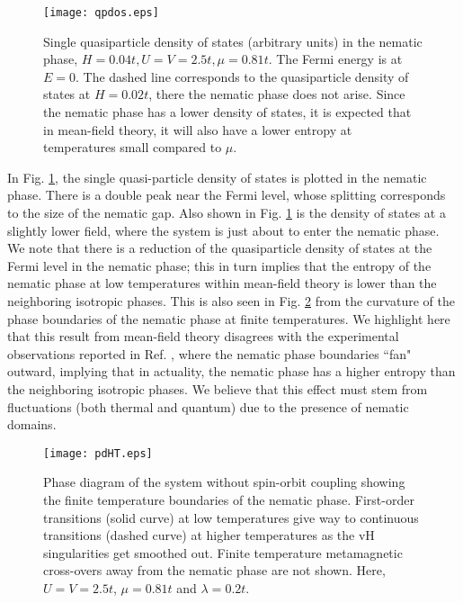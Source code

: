 \documentclass[prb,aps,amssymb,showpacs,twocolumn,amsmath,floatfix]{revtex4}
\begin{document}
\begin{figure}
\texttt{[image: qpdos.eps]}
\caption{ Single quasiparticle density of states (arbitrary units) in the nematic phase, $ H =0.04t, U=V=2.5t, \mu = 0.81t$.  
The Fermi energy is at $E=0$.  The dashed line corresponds to the quasiparticle density of states at 
  $H=0.02t$, there the nematic phase does not arise.  Since the nematic phase has a lower density 
  of states, it is expected that in mean-field theory, it will also have a lower entropy at temperatures small compared to $\mu$.   }
   \label{fig3}
\end{figure} 

In Fig. \ref{fig3}, the single quasi-particle density of states is plotted in the nematic phase.  There is a 
double peak near the Fermi level, whose splitting corresponds to the size of the nematic gap.  
Also shown in Fig. \ref{fig3} is the density of states at a slightly lower field, where the system is just 
about to enter the nematic phase.  We note that there is a reduction of the quasiparticle density 
of states at the Fermi level in the nematic phase; this in turn implies that the entropy of the nematic phase at low temperatures 
within mean-field theory is lower than the neighboring isotropic phases.  This is also seen 
in Fig. \ref{pdHT} from the curvature of the phase boundaries of the nematic phase at finite temperatures.  
We highlight here that this result from mean-field theory disagrees with the experimental observations 
reported  in Ref.  \cite{Borzi2007}, where the nematic phase boundaries ``fan" outward, implying  that in actuality, 
the nematic phase has a higher entropy than the neighboring isotropic phases.  We believe 
that this effect must stem from fluctuations (both thermal and quantum) due to the presence of 
nematic domains.  


\begin{figure}
\texttt{[image: pdHT.eps]}
\caption{Phase diagram of the system  without spin-orbit coupling showing the finite temperature 
boundaries of the nematic phase.  First-order transitions (solid curve) at low temperatures give way 
to continuous transitions (dashed curve) at higher temperatures as the vH singularities get smoothed out.  Finite temperature metamagnetic cross-overs away from the nematic phase are not shown.  Here, $U=V=2.5t$, $\mu = 0.81t$ and $\lambda = 0.2t$.    }
\label{pdHT}
\end{figure} 
\end{document}
